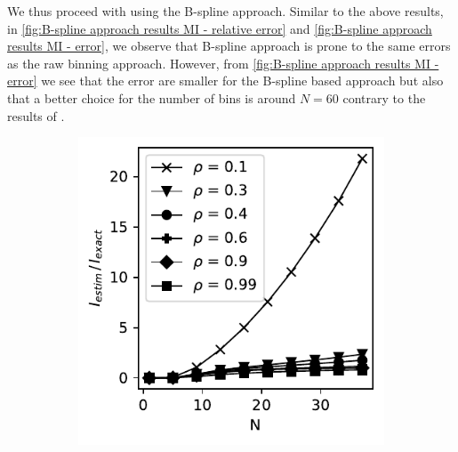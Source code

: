 \documentclass[../Thesis.tex]{subfiles}
\begin{document}
We thus proceed with using the B-spline approach. Similar to the above results, in \autoref{fig:B-spline approach results MI - relative error} and \autoref{fig:B-spline approach results MI - error}, we observe that B-spline approach is prone to the same errors as the raw binning approach. However, from \autoref{fig:B-spline approach results MI - error} we see that the error are smaller for the B-spline based approach but also that a better choice for the number of bins is around $N = 60$ contrary to the results of \cite{Network-deconvolution-as-a-general-method-to-distinguish-direct-dependencies-in-networks}.


\begin{figure}[H]
    \centering
    \begin{subfigure}[t]{0.32\textwidth}
        \centering
        \includegraphics[width=\linewidth]{figures/ND examples/MI calc/gaussian example original all - B-spline.pdf}
        \caption{}
    \end{subfigure}%
    ~
    \begin{subfigure}[t]{0.32\textwidth}
        \centering

\end{subfigure}
\end{figure}
\end{document}
